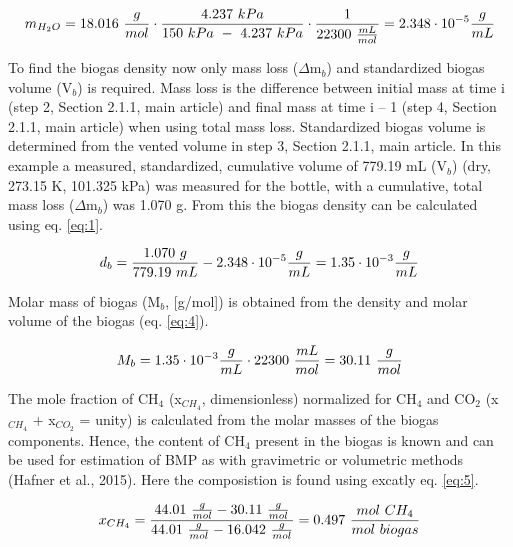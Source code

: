\documentclass[]{article}
\begin{document}
\begin{equation*}
\centering
  m_{H_2O} = 18.016\ \frac{g}{mol} \cdot \frac{4.237\ kPa}{150\ kPa\ -\ 4.237\ kPa} \cdot \frac{1}{22300\ \frac{mL}{mol}} = 2.348 \cdot 10^{-5} \frac{g}{mL}
\end{equation*}

\noindent To find the biogas density now only mass loss ($\Delta$m$_b$) and standardized biogas volume (V$_b$) is required. Mass loss is the difference between initial mass at time i (step 2, Section 2.1.1, main article) and final mass at time i – 1 (step 4, Section 2.1.1, main article) when using total mass loss. Standardized biogas volume is determined from the vented volume in step 3, Section 2.1.1, main article.
In this example a measured, standardized, cumulative volume of 779.19 mL (V$_b$) (dry, 273.15 \degree K, 101.325 kPa) was measured for the bottle, with a cumulative, total mass loss ($\Delta$m$_b$) was 1.070 g. From this the biogas density can be calculated using eq. \ref{eq:1}.

\begin{equation*}
  \centering
  d_b=\frac{1.070\ g}{779.19\ mL} - 2.348 \cdot 10^{-5} \frac{g}{mL} = 1.35 \cdot 10^{-3} \frac{g}{mL}
\end{equation*}

\noindent Molar mass of biogas (M$_b$, [g/mol]) is obtained from the density and molar volume of the biogas (eq. \ref{eq:4}).

\begin{equation*}
  \centering
  M_b= 1.35 \cdot 10^{-3} \frac{g}{mL} \cdot 22300\ \frac{mL}{mol} = 30.11\ \frac{g}{mol}
\end{equation*}

\noindent The mole fraction of CH$_4$ (x$_{CH_4}$, dimensionless) normalized for CH$_4$ and CO$_2$ (x$_{CH_4}$ + x$_{CO_2}$ = unity) is calculated from the molar masses of the biogas components. Hence, the content of CH$_4$ present in the biogas is known and can be used for estimation of BMP as with gravimetric or volumetric methods (Hafner et al., 2015). Here the composistion is found using excatly eq. \ref{eq:5}.

\begin{equation*}
  \centering
  x_{CH_4}=\frac{44.01\ \frac{g}{mol}-30.11\ \frac{g}{mol}}{44.01\ \frac{g}{mol}-16.042\ \frac{g}{mol}} = 0.497\ \frac{mol\ CH_4}{mol\ biogas}
\end{equation*}
\end{document}

